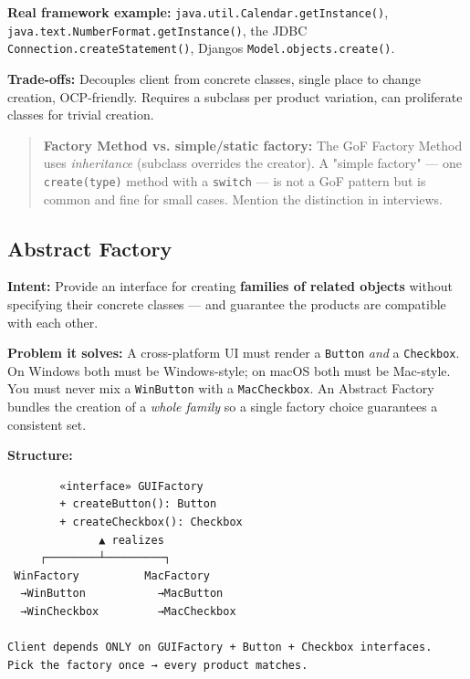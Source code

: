 \documentclass[11pt]{article}
\begin{document}
\textbf{Real framework example:} \texttt{java.util.Calendar.getInstance()}, \texttt{java.text.NumberFormat.getInstance()}, the JDBC \texttt{Connection.createStatement()}, Django\textquotesingle s \texttt{Model.objects.create()}.

\textbf{Trade-offs:} Decouples client from concrete classes, single place to change creation, OCP-friendly. Requires a subclass per product variation, can proliferate classes for trivial creation.

\begin{quote}
\textbf{Factory Method vs. simple/static factory:} The GoF Factory Method uses \emph{inheritance} (subclass overrides the creator). A "simple factory" --- one \texttt{create(type)} method with a \texttt{switch} --- is not a GoF pattern but is common and fine for small cases. Mention the distinction in interviews.
\end{quote}

\subsection{Abstract Factory}\label{abstract-factory}

\textbf{Intent:} Provide an interface for creating \textbf{families of related objects} without specifying their concrete classes --- and guarantee the products are compatible with each other.

\textbf{Problem it solves:} A cross-platform UI must render a \texttt{Button} \emph{and} a \texttt{Checkbox}. On Windows both must be Windows-style; on macOS both must be Mac-style. You must never mix a \texttt{WinButton} with a \texttt{MacCheckbox}. An Abstract Factory bundles the creation of a \emph{whole family} so a single factory choice guarantees a consistent set.

\textbf{Structure:}

\setcodelang{}

\begin{verbatim}
        «interface» GUIFactory
        + createButton(): Button
        + createCheckbox(): Checkbox
              ▲ realizes
     ┌────────┴─────────┐
 WinFactory          MacFactory
  →WinButton           →MacButton
  →WinCheckbox         →MacCheckbox

Client depends ONLY on GUIFactory + Button + Checkbox interfaces.
Pick the factory once → every product matches.
\end{verbatim}

\end{document}
